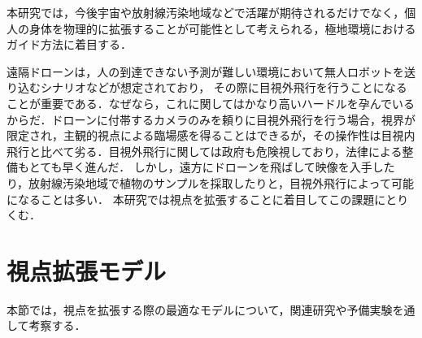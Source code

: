 本研究では，今後宇宙や放射線汚染地域などで活躍が期待されるだけでなく，個人の身体を物理的に拡張することが可能性として考えられる，極地環境におけるガイド方法に着目する．

遠隔ドローンは，人の到達できない予測が難しい環境において無人ロボットを送り込むシナリオなどが想定されており，
その際に目視外飛行を行うことになることが重要である．なぜなら，これに関してはかなり高いハードルを孕んでいるからだ．ドローンに付帯するカメラのみを頼りに目視外飛行を行う場合，視界が限定され，主観的視点による臨場感を得ることはできるが，その操作性は目視内飛行と比べて劣る．目視外飛行に関しては政府も危険視しており，法律による整備もとても早く進んだ．
しかし，遠方にドローンを飛ばして映像を入手したり，放射線汚染地域で植物のサンプルを採取したりと，目視外飛行によって可能になることは多い．
本研究では視点を拡張することに着目してこの課題にとりくむ．


\section{視点拡張モデル}
本節では，視点を拡張する際の最適なモデルについて，関連研究や予備実験を通して考察する．

